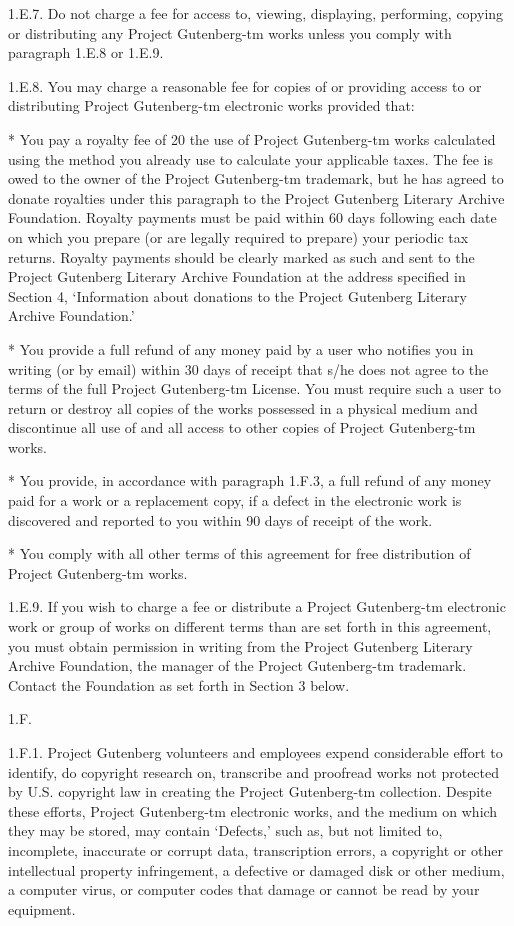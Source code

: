 \documentclass[oneside]{book}
\begin{document}
\begin{text}
1.E.7. Do not charge a fee for access to, viewing, displaying,
performing, copying or distributing any Project Gutenberg-tm works
unless you comply with paragraph 1.E.8 or 1.E.9.

1.E.8. You may charge a reasonable fee for copies of or providing
access to or distributing Project Gutenberg-tm electronic works
provided that:

* You pay a royalty fee of 20%
  the use of Project Gutenberg-tm works calculated using the method
  you already use to calculate your applicable taxes. The fee is owed
  to the owner of the Project Gutenberg-tm trademark, but he has
  agreed to donate royalties under this paragraph to the Project
  Gutenberg Literary Archive Foundation. Royalty payments must be paid
  within 60 days following each date on which you prepare (or are
  legally required to prepare) your periodic tax returns. Royalty
  payments should be clearly marked as such and sent to the Project
  Gutenberg Literary Archive Foundation at the address specified in
  Section 4, `Information about donations to the Project Gutenberg
  Literary Archive Foundation.'

* You provide a full refund of any money paid by a user who notifies
  you in writing (or by email) within 30 days of receipt that s/he
  does not agree to the terms of the full Project Gutenberg-tm
  License. You must require such a user to return or destroy all
  copies of the works possessed in a physical medium and discontinue
  all use of and all access to other copies of Project Gutenberg-tm
  works.

* You provide, in accordance with paragraph 1.F.3, a full refund of
  any money paid for a work or a replacement copy, if a defect in the
  electronic work is discovered and reported to you within 90 days of
  receipt of the work.

* You comply with all other terms of this agreement for free
  distribution of Project Gutenberg-tm works.

1.E.9. If you wish to charge a fee or distribute a Project
Gutenberg-tm electronic work or group of works on different terms than
are set forth in this agreement, you must obtain permission in writing
from the Project Gutenberg Literary Archive Foundation, the manager of
the Project Gutenberg-tm trademark. Contact the Foundation as set
forth in Section 3 below.

1.F.

1.F.1. Project Gutenberg volunteers and employees expend considerable
effort to identify, do copyright research on, transcribe and proofread
works not protected by U.S. copyright law in creating the Project
Gutenberg-tm collection. Despite these efforts, Project Gutenberg-tm
electronic works, and the medium on which they may be stored, may
contain `Defects,' such as, but not limited to, incomplete, inaccurate
or corrupt data, transcription errors, a copyright or other
intellectual property infringement, a defective or damaged disk or
other medium, a computer virus, or computer codes that damage or
cannot be read by your equipment.


\end{text}
\end{document}
